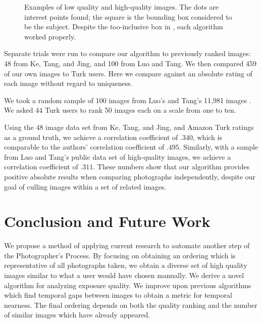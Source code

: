 \documentclass{article}
\begin{document}
\begin{figure}
{	\label{example_good}
}
\caption{Examples of  low quality and  high-quality images. The dots are interest points found; the square is the bounding box considered to be the subject. Despite the too-inclusive box in , each algorithm worked properly.}
\label{fig:Examples}
\end{figure}

Separate trials were run to compare our algorithm to previously ranked images: 48 from Ke, Tang, and Jing\cite{1640788}, and 100 from Luo and Tang\cite{springerlink:10.1007/978-3-540-88690-7_29}. We then compared 459 of our own images to Turk users. Here we compare against an absolute rating of each image without regard to uniqueness.

We took a random sample of 100 images from Luo's and Tang's 11,981 images \cite{springerlink:10.1007/978-3-540-88690-7_29}. We asked 44 Turk users to rank 50 images each on a scale from one to ten.

Using the 48 image data set from Ke, Tang, and Jing\cite{1640788}, and Amazon Turk ratings as a ground truth, we achieve a correlation coefficient of \(.340\), which is comparable to the authors' correlation coefficient of \(.495\). Similarly, with a sample from Luo and Tang's public data set of high-quality images\cite{springerlink:10.1007/978-3-540-88690-7_29}, we achieve a correlation coefficient of \(.311\). These numbers show that our algorithm provides positive absolute results when comparing photographs independently, despite our goal of culling images within a set of related images.


\section{Conclusion and Future Work}
We propose a method of applying current research to automate another step of the Photographer's Process. By focusing on obtaining an ordering which is representative of all photographs taken, we obtain a diverse set of high quality images similar to what a user would have chosen manually. We derive a novel algorithm for analyzing exposure quality. We improve upon previous algorithms which find temporal gaps between images to obtain a metric for temporal nearness. The final ordering depends on both the quality ranking and the number of similar images which have already appeared.
\end{document}
